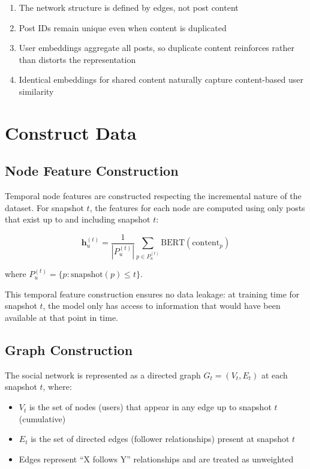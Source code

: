 \begin{enumerate}
	\item The network structure is defined by edges, not post content
	\item Post IDs remain unique even when content is duplicated
	\item User embeddings aggregate all posts, so duplicate content reinforces rather than distorts the representation
	\item Identical embeddings for shared content naturally capture content-based user similarity
\end{enumerate}

\section{Construct Data}

\subsection*{Node Feature Construction}

Temporal node features are constructed respecting the incremental nature of the dataset. For snapshot $t$, the features for each node are computed using only posts that exist up to and including snapshot $t$:

\begin{equation}
	\mathbf{h}_u^{(t)} = \frac{1}{|P_u^{(t)}|} \sum_{p \in P_u^{(t)}} \text{BERT}(\text{content}_p)
\end{equation}

where $P_u^{(t)} = \{p : \text{snapshot}(p) \leq t\}$.

This temporal feature construction ensures no data leakage: at training time for snapshot $t$, the model only has access to information that would have been available at that point in time.

\subsection*{Graph Construction}

The social network is represented as a directed graph $G_t = (V_t, E_t)$ at each snapshot $t$, where:

\begin{itemize}
	\item $V_t$ is the set of nodes (users) that appear in any edge up to snapshot $t$ (cumulative)
	\item $E_t$ is the set of directed edges (follower relationships) present at snapshot $t$
	\item Edges represent ``X follows Y'' relationships and are treated as unweighted
\end{itemize}

